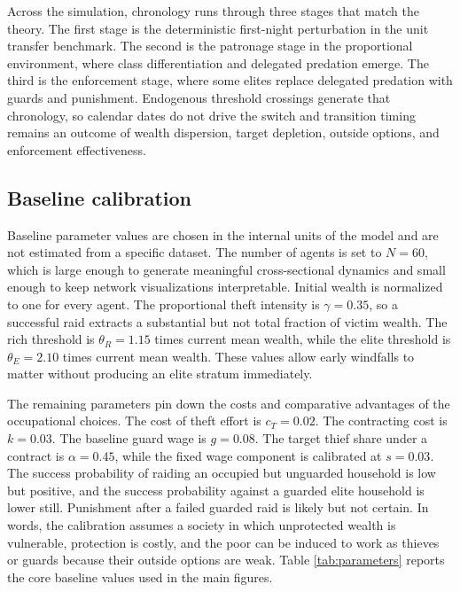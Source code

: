 Across the simulation, chronology runs through three stages that match the theory. The first stage is the deterministic first-night perturbation in the unit transfer benchmark. The second is the patronage stage in the proportional environment, where class differentiation and delegated predation emerge. The third is the enforcement stage, where some elites replace delegated predation with guards and punishment. Endogenous threshold crossings generate that chronology, so calendar dates do not drive the switch and transition timing remains an outcome of wealth dispersion, target depletion, outside options, and enforcement effectiveness.

\subsection{Baseline calibration}

Baseline parameter values are chosen in the internal units of the model and are not estimated from a specific dataset. The number of agents is set to $N=60$, which is large enough to generate meaningful cross-sectional dynamics and small enough to keep network visualizations interpretable. Initial wealth is normalized to one for every agent. The proportional theft intensity is $\gamma=0.35$, so a successful raid extracts a substantial but not total fraction of victim wealth. The rich threshold is $\theta_R = 1.15$ times current mean wealth, while the elite threshold is $\theta_E = 2.10$ times current mean wealth. These values allow early windfalls to matter without producing an elite stratum immediately.

The remaining parameters pin down the costs and comparative advantages of the occupational choices. The cost of theft effort is $c_T = 0.02$. The contracting cost is $k = 0.03$. The baseline guard wage is $g = 0.08$. The target thief share under a contract is $\alpha = 0.45$, while the fixed wage component is calibrated at $s = 0.03$. The success probability of raiding an occupied but unguarded household is low but positive, and the success probability against a guarded elite household is lower still. Punishment after a failed guarded raid is likely but not certain. In words, the calibration assumes a society in which unprotected wealth is vulnerable, protection is costly, and the poor can be induced to work as thieves or guards because their outside options are weak. Table \ref{tab:parameters} reports the core baseline values used in the main figures.

\begin{table}[tbp]
    \centering
    \caption{Baseline simulation parameters. The values define the benchmark environment used in the main figures, while the parameter sweeps vary the key margins systematically around this baseline.}
    \label{tab:parameters}
    
\end{table}

